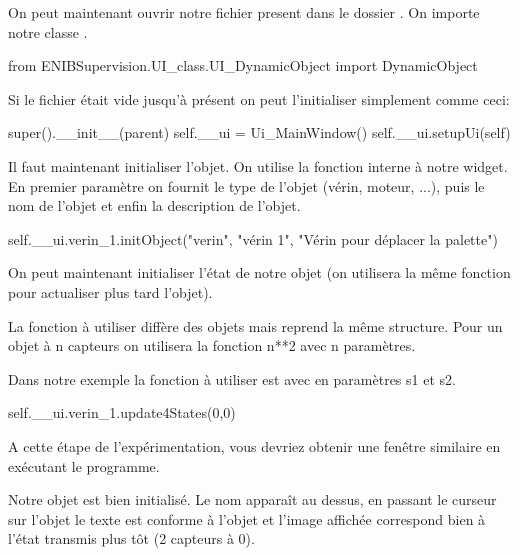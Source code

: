On peut maintenant ouvrir notre  fichier  present dans le dossier . On importe notre classe .

\begin{pyCode}
from ENIBSupervision.UI_class.UI_DynamicObject import DynamicObject
\end{pyCode}


Si le fichier  était vide jusqu'à présent on peut l'initialiser simplement comme ceci:

\begin{pyCode}
    super().__init__(parent)
    self.__ui = Ui_MainWindow()
    self.__ui.setupUi(self)
\end{pyCode}


Il faut maintenant initialiser l'objet. On utilise la fonction  interne à notre widget. En premier paramètre on fournit le type de l'objet (vérin, moteur, ...), puis le nom de l'objet et enfin la description de l'objet.

\begin{pyCode}
    self.__ui.verin_1.initObject("verin", "vérin 1", "Vérin pour déplacer la palette")
\end{pyCode}

On peut maintenant initialiser l'état de notre objet (on utilisera la même fonction pour actualiser plus tard l'objet). 

La fonction à utiliser diffère  des objets mais reprend la même structure. Pour un objet à n capteurs on utilisera la fonction  n**2  avec n paramètres.

Dans notre exemple la fonction à utiliser est  avec en paramètres s1 et s2. 

\begin{pyCode}
    self.__ui.verin_1.update4States(0,0)
\end{pyCode}

A cette étape de l'expérimentation, vous devriez obtenir une fenêtre similaire en exécutant le programme.\\


Notre objet est bien initialisé. Le nom apparaît au dessus, en passant le curseur sur l'objet le texte est conforme à l'objet et l'image affichée correspond bien à l'état transmis plus tôt (2 capteurs à 0).\\

